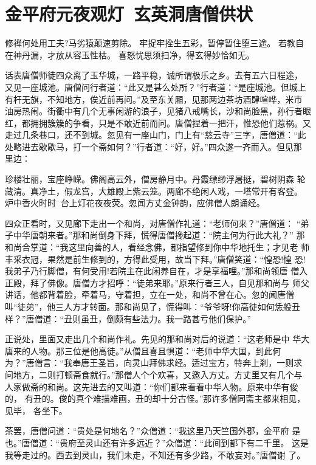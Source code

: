 \chapter{金平府元夜观灯~玄英洞唐僧供状}

修禅何处用工夫?马劣猿颠速剪除。
牢捉牢拴生五彩，暂停暂住堕三途。
若教自在神丹漏，才放从容玉性枯。
喜怒忧思须扫净，得玄得妙恰如无。

话表唐僧师徒四众离了玉华城，一路平稳，诚所谓极乐之乡。去有五六日程途，
又见一座城池。唐僧问行者道：“此又是甚么处所？”行者道：“是座城池。但城上
有杆无旗，不知地方，俟近前再问。”及至东关厢，见那两边茶坊酒肆喧哗，米市
油房热闹。街衢中有几个无事闲游的浪子，见猪八戒嘴长，沙和尚脸黑，孙行者眼
红，都拥拥簇簇的争看，只是不敢近前而问。唐僧捏着一把汗，惟恐他们惹祸。又
走过几条巷口，还不到城。忽见有一座山门，门上有“慈云寺”三字，唐僧道：“此
处略进去歇歇马，打一个斋如何？”行者道：“好，好。”四众遂一齐而入。但见那
里边：

珍楼壮丽，宝座峥嵘。佛阁高云外，僧房静月中。丹霞缥缈浮屠挺，碧树阴森
轮藏清。真净土，假龙宫，大雄殿上紫云笼。两廊不绝闲人戏，一塔常开有客登。
炉中香火时时，台上灯花夜夜荧。忽闻方丈金钟韵，应佛僧人朗诵经。

四众正看时，又见廊下走出一个和尚，对唐僧作礼道：“老师何来？”唐僧道：
“弟子中华唐朝来者。”那和尚倒身下拜，慌得唐僧搀起道：“院主何为行此大礼？”
那和尚合掌道：“我这里向善的人，看经念佛，都指望修到你中华地托生；才见老
师丰采衣冠，果然是前生修到的，方得此受用，故当下拜。”唐僧笑道：“惶恐!惶
恐!我弟子乃行脚僧，有何受用!若院主在此闲养自在，才是享福哩。”那和尚领唐
僧入正殿，拜了佛像。唐僧方才招呼：“徒弟来耶。”原来行者三人，自见那和尚与
师父讲话，他都背着脸，牵着马，守着担，立在一处，和尚不曾在心。忽的闻唐僧
叫“徒弟”，他三人方才转面。那和尚见了，慌得叫：“爷爷呀!你高徒如何恁般丑
样？”唐僧道：“丑则虽丑，倒颇有些法力。我一路甚亏他们保护。”

正说处，里面又走出几个和尚作礼。先见的那和尚对后的说道：“这老师是中
华大唐来的人物。那三位是他高徒。”从僧且喜且惧道：“老师中华大国，到此何
为？”唐僧言：“我奉唐王圣旨，向灵山拜佛求经。适过宝方，特奔上刹，一则求
问地方，二则打顿斋食就行。”那僧人个个欢喜，又邀入方丈。方丈里又有几个与
人家做斋的和尚。这先进去的又叫道：“你们都来看看中华人物。原来中华有俊的，
有丑的。俊的真个难描难画，丑的却十分古怪。”那许多僧同斋主都来相见，见毕，
各坐下。

茶罢，唐僧问道：“贵处是何地名？”众僧道：“我这里乃天竺国外郡，金平府
是也。”唐僧道：“贵府至灵山还有许多远近？”众僧道：“此间到都下有二千里。
这是我等走过的。西去到灵山，我们未走，不知还有多少路，不敢妄对。”唐僧谢
了。

